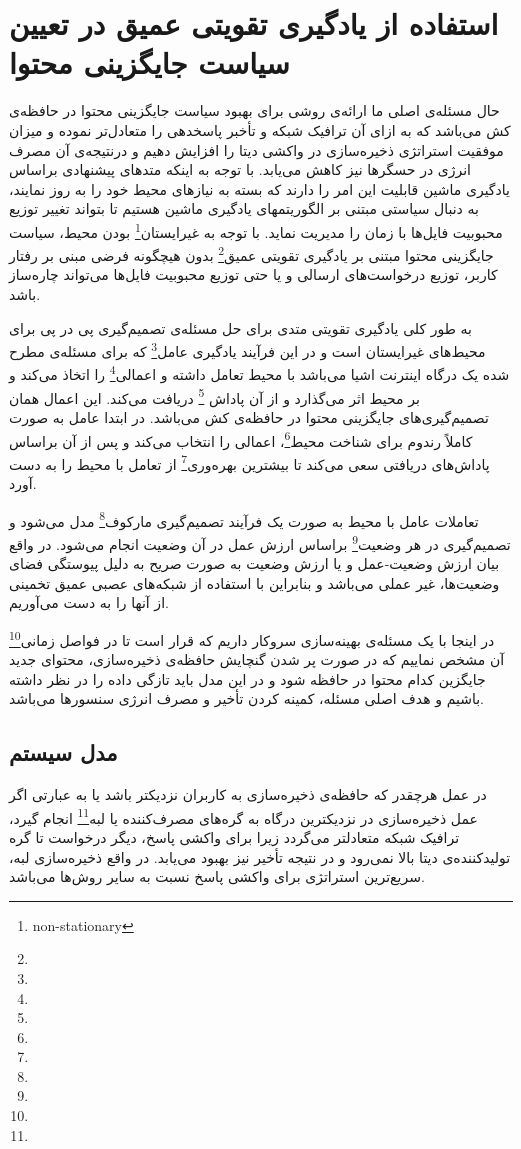 \section{استفاده از یادگیری تقویتی عمیق در تعیین سیاست جایگزینی محتوا}
حال مسئله‌ی اصلی ما ارائه‌ی روشی برای بهبود سیاست جایگزینی محتوا در حافظه‌ی کش می‌باشد که به ازای آن ترافیک شبکه و تأخبر پاسخدهی را متعادل‌تر نموده و میزان موفقیت استراتژی ذخیره‌سازی در واکشی دیتا را افزایش دهیم و درنتیجه‌ی آن مصرف انرژی در حسگرها نیز کاهش می‌یابد. با توجه به اینکه متدهای پیشنهادی براساس یادگیری ماشین قابلیت این امر را دارند که بسته به نیازهای محیط خود را به روز نمایند، به دنبال سیاستی مبتنی بر الگوریتمهای یادگیری ماشین هستیم تا بتواند تغییر توزیع محبوبیت فایل‌ها با زمان را مدیریت نماید. با توجه به غیرایستان\footnote{non-stationary} بودن محیط، سیاست جایگزینی محتوا مبتنی بر یادگیری تقویتی عمیق\footnote{} بدون هیچگونه فرضی مبنی بر رفتار کاربر، توزیع درخواست‌های ارسالی و یا حتی توزیع محبوبیت فایل‌ها می‌تواند چاره‌ساز باشد. 

به طور کلی یادگیری تقویتی متدی برای حل مسئله‌ی تصمیم‌گیری پی در پی برای محیط‌های غیرایستان است و در این فرآیند یادگیری عامل\footnote{} که برای مسئله‌ی مطرح شده یک درگاه اینترنت اشیا می‌باشد با محیط تعامل داشته و اعمالی\footnote{} را اتخاذ می‌کند و بر محیط اثر می‌گذارد و از آن پاداش \footnote{} دریافت می‌کند. این اعمال همان تصمیم‌گیری‌های جایگزینی محتوا در حافظه‌ی کش می‌باشد. در ابتدا عامل به صورت کاملاً رندوم برای شناخت محیط\footnote{}، اعمالی را انتخاب می‌کند و پس از آن براساس پاداش‌های دریافتی سعی می‌کند تا بیشترین بهره‌وری\footnote{} از تعامل با محیط را به دست آورد.

تعاملات عامل با محیط به صورت یک فرآیند تصمیم‌گیری مارکوف\footnote{} مدل می‌شود و تصمیم‌گیری در هر وضعیت\footnote{} براساس ارزش عمل در آن وضعیت انجام می‌شود. در واقع بیان ارزش وضعیت-عمل و یا ارزش وضعیت    به صورت صریح به دلیل پیوستگی فضای وضعیت‌ها،‌ غیر عملی می‌باشد و بنابراین با استفاده از  شبکه‌های عصبی عمیق تخمینی از آنها را به دست می‌آوریم. \cite{cachingtransientdata2018}

در اینجا با یک مسئله‌ی بهینه‌سازی سروکار داریم که قرار است تا در فواصل زمانی\footnote{} آن مشخص نماییم که در صورت پر شدن گنچایش حافظه‌ی ذخیره‌سازی، محتوای جدید جایگزین کدام محتوا در حافظه شود و در این مدل باید تازگی داده را در نظر داشته باشیم و هدف اصلی مسئله، کمینه کردن تأخیر و مصرف انرژی سنسورها می‌باشد.

\subsection{مدل سیستم}
در عمل هرچقدر که حافظه‌ی ذخیره‌سازی به کاربران نزدیکتر باشد یا به عبارتی اگر عمل ذخیره‌سازی در نزدیکترین درگاه به گره‌های مصرف‌کننده یا لبه\footnote{} انجام گیرد، ترافیک شبکه متعادلتر می‌گردد زیرا برای واکشی پاسخ، دیگر درخواست تا گره تولیدکننده‌ی دیتا بالا نمی‌رود و در نتیجه تأخیر نیز بهبود می‌یابد. در واقع ذخیره‌سازی لبه، سریع‌ترین استراتژی برای واکشی پاسخ نسبت به سایر روش‌ها می‌باشد.


